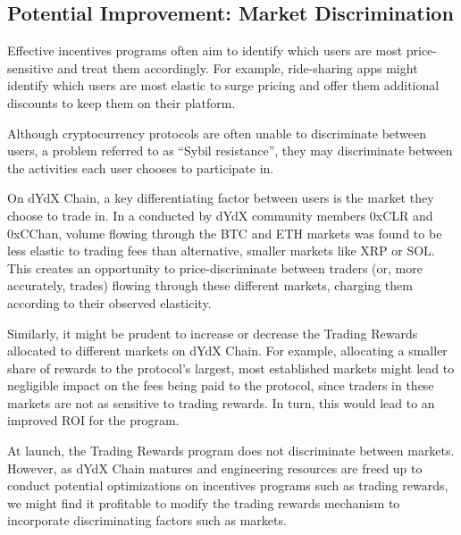     \subsection{Potential Improvement: Market Discrimination}

        Effective incentives programs often aim to identify which users are most price-sensitive and treat them accordingly. For example, ride-sharing apps might identify which users are most elastic to surge pricing and offer them additional discounts to keep them on their platform. 

        Although cryptocurrency protocols are often unable to discriminate between users, a problem referred to as ``Sybil resistance'', they may discriminate between the activities each user chooses to participate in.

        On dYdX Chain, a key differentiating factor between users is the market they choose to trade in. In a  conducted by dYdX community members 0xCLR and 0xCChan, volume flowing through the BTC and ETH markets was found to be less elastic to trading fees than alternative, smaller markets like XRP or SOL. This creates an opportunity to price-discriminate between traders (or, more accurately, trades) flowing through these different markets, charging them according to their observed elasticity.

        Similarly, it might be prudent to increase or decrease the Trading Rewards allocated to different markets on dYdX Chain. For example, allocating a smaller share of rewards to the protocol's largest, most established markets might lead to negligible impact on the fees being paid to the protocol, since traders in these markets are not as sensitive to trading rewards. In turn, this would lead to an improved ROI for the program.

        At launch, the Trading Rewards program does not discriminate between markets. However, as dYdX Chain matures and engineering resources are freed up to conduct potential optimizations on incentives programs such as trading rewards, we might find it profitable to modify the trading rewards mechanism to incorporate discriminating factors such as markets.